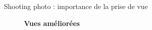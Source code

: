 \begin{frame}{Shooting photo : importance de la prise de vue}
\begin{minipage}{0.48\linewidth}
\begin{figure}
      {\footnotesize\textbf{Vues améliorées}}
    \end{figure}
  \end{minipage}
\end{frame}